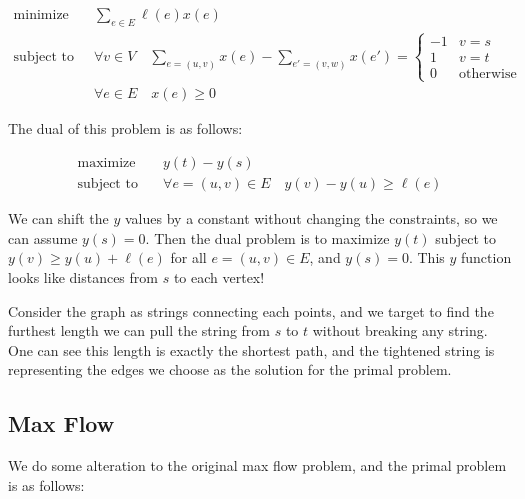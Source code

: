 \begin{align*}
	\text{minimize} \quad   & \sum_{e\in E} \ell(e) x(e)                                                               \\
	\text{subject to} \quad & \forall v\in V \quad	\sum_{e=(u,v)} x(e) - \sum_{e'=(v,w)} x(e') = \begin{cases}
		                                                                                             -1 & v = s            \\
		                                                                                             1  & v = t            \\
		                                                                                             0  & \text{otherwise}
	                                                                                             \end{cases} \\
	                        & \forall e \in E \quad x(e) \geq 0
\end{align*}

The dual of this problem is as follows:

\begin{align*}
	\text{maximize} \quad   & y(t) - y(s)                                         \\
	\text{subject to} \quad & \forall e=(u,v)\in E \quad y(v) - y(u) \geq \ell(e)
\end{align*}

We can shift the $y$ values by a constant without changing the constraints, so we can assume $y(s) = 0$. Then the dual problem is to maximize $y(t)$ subject to $y(v) \geq y(u) + \ell(e)$ for all $e=(u,v)\in E$, and $y(s) = 0$. This $y$ function looks like distances from $s$ to each vertex!

Consider the graph as strings connecting each points, and we target to find the furthest length we can pull the string from $s$ to $t$ without breaking any string. One can see this length is exactly the shortest path, and the tightened string is representing the edges we choose as the solution for the primal problem.

\subsection{Max Flow}

We do some alteration to the original max flow problem, and the primal problem is as follows:

